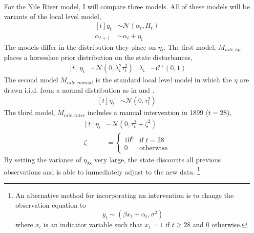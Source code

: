 \documentclass{article}
\newcommand{\dist}[1]{\mathcal{#1}}
\newcommand{\paren}[1]{\ensuremath{\left(#1\right)}}
\newcommand{\dnorm}[1]{\ensuremath{\dist{N}\paren{#1}}}
\newcommand{\dhalfcauchy}[1]{\ensuremath{\dist{C}^{+}\paren{#1}}}
\begin{document}
For the Nile River model, I will compare three models. 
All of these models will be variants of the local level model,
\begin{equation}
  \label{eq:21}
  \begin{aligned}[t]
    y_{t} &\sim \dnorm{\alpha_{t}, H_{t}} \\
    \alpha_{t + 1} &\sim \alpha_{t} + \eta_{t}
  \end{aligned}
\end{equation}
The models differ in the distribution they place on $\eta_{t}$.
The first model, $M_{nile,hp}$ places a horseshoe prior distribution on the state disturbances,
\begin{equation}
  \label{eq:22}
  \begin{aligned}[t]
    \eta_{t} & \sim \dnorm{0, \lambda^{2}_{t} \tau_{t}^{2}} & \lambda_{t} & \sim \dhalfcauchy{0, 1}
  \end{aligned}
\end{equation}
The second model $M_{nile,normal}$ is the standard local level model in which the $\eta$ are drawn i.i.d. from a normal distribution as in \textcite{DurbinKoopman2001} and \textcite{petris2011state},
\begin{equation}
  \label{eq:9}
  \begin{aligned}[t]
    \eta_{t} & \sim \dnorm{0, \tau_{t}^{2}}
  \end{aligned}
\end{equation}
The third model, $M_{nile,inter}$ includes a manual intervention in 1899 ($t = 28$),
\begin{equation}
  \label{eq:12}
  \begin{aligned}[t]
    \eta_{t} & \sim \dnorm{0, \tau_{t}^{2} + \zeta^{2}} \\
    \zeta & = 
    \begin{cases}
      10^{6} & \text{if $t = 28$} \\
      0 & \text{otherwise}
    \end{cases}
  \end{aligned}
\end{equation}
By setting the variance of $\eta_{28}$ very large, the state discounts all previous observations and is able to immediately adjust to the new data.
\footnote{An alternative method for incorporating an intervention is to change the observation equation to
  \begin{equation}
    \label{eq:23}
    y_{t} \sim( \beta x_{t} + \alpha_{t}, \sigma^{2})
  \end{equation}
  where $x_{t}$ is an indicator variable such that $x_{t} = 1$ if $t \geq 28$ and 0 otherwise.
}
\end{document}
